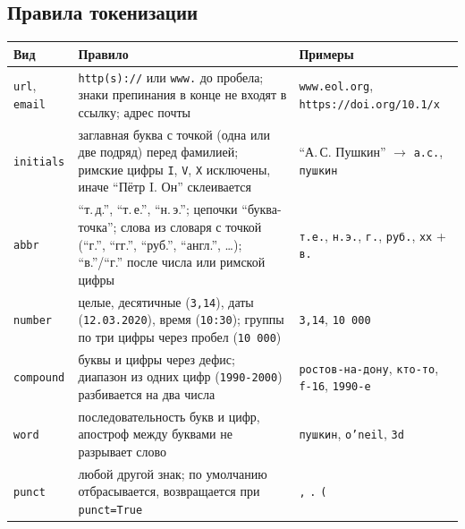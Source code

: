 \subsection{Правила токенизации}
\begin{longtable}{|p{2.4cm}|p{6.2cm}|p{5.8cm}|}
\hline
\textbf{Вид} & \textbf{Правило} & \textbf{Примеры} \\ \hline
\texttt{url}, \texttt{email} & \texttt{http(s)://} или \texttt{www.} до пробела; знаки
препинания в конце не входят в ссылку; адрес почты & \texttt{www.eol.org},
\texttt{https://doi.org/10.1/x} \\ \hline
\texttt{initials} & заглавная буква с точкой (одна или две подряд) перед
фамилией; римские цифры \texttt{I}, \texttt{V}, \texttt{X} исключены, иначе
\enquote{Пётр I. Он} склеивается & \enquote{А.\,С. Пушкин} $\to$ \texttt{а.с.}, \texttt{пушкин} \\ \hline
\texttt{abbr} & \enquote{т.\,д.}, \enquote{т.\,е.}, \enquote{н.\,э.}; цепочки
\enquote{буква-точка}; слова из словаря с точкой (\enquote{г.}, \enquote{гг.},
\enquote{руб.}, \enquote{англ.}, \dots); \enquote{в.}/\enquote{г.} после числа или римской
цифры & \texttt{т.е.}, \texttt{н.э.}, \texttt{г.}, \texttt{руб.}, \texttt{xx} + \texttt{в.} \\ \hline
\texttt{number} & целые, десятичные (\texttt{3,14}), даты (\texttt{12.03.2020}),
время (\texttt{10:30}); группы по три цифры через пробел (\texttt{10 000}) & \texttt{3,14}, \texttt{10 000} \\ \hline
\texttt{compound} & буквы и цифры через дефис; диапазон из одних цифр
(\texttt{1990-2000}) разбивается на два числа & \texttt{ростов-на-дону}, \texttt{кто-то}, \texttt{f-16}, \texttt{1990-е} \\ \hline
\texttt{word} & последовательность букв и цифр, апостроф между буквами
не разрывает слово & \texttt{пушкин}, \texttt{o'neil}, \texttt{3d} \\ \hline
\texttt{punct} & любой другой знак; по умолчанию отбрасывается, возвращается
при \texttt{punct=True} & \texttt{,} \texttt{.} \texttt{(} \\ \hline
\end{longtable}


